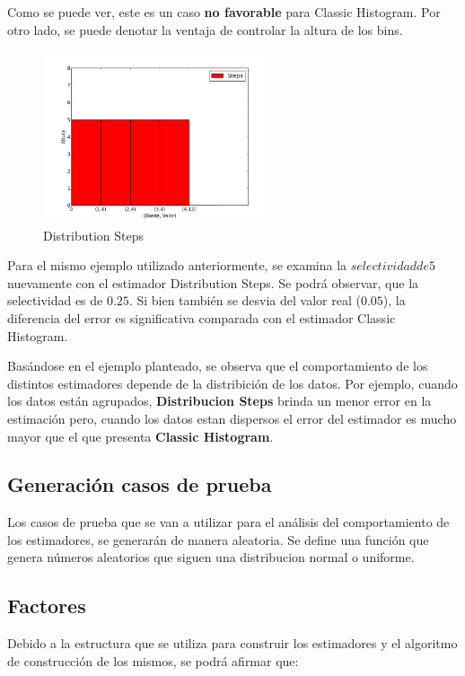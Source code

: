 \documentclass[10pt, a4paper,english,spanish,hidelinks]{article}
\begin{document}
Como se puede ver, este es un caso \textbf{no favorable} para Classic Histogram. Por otro lado, se puede denotar la ventaja de controlar la altura de los bins.

\newpage
\begin{figure}[h!]
  \centering
  \includegraphics[width=0.6\textwidth]{./imagenes/ejb1_ejemplo_steps.png}
  \caption{Distribution Steps}
\end{figure}


Para el mismo ejemplo utilizado anteriormente, se examina la $selectividad de 5$ nuevamente con el estimador Distribution Steps.
Se podrá observar, que la selectividad es de $0.25$. Si bien también se desvia del
valor real ($0.05$), la diferencia del error es significativa comparada con el estimador Classic Histogram.


Basándose en el ejemplo planteado, se observa que el comportamiento de los distintos estimadores
depende de la distribición de los datos.
Por ejemplo, cuando los datos están agrupados, \textbf{Distribucion Steps} brinda un menor
error en la estimación pero, cuando los datos estan dispersos el error del estimador es
mucho mayor que el que presenta \textbf{Classic Histogram}.


\subsection{Generación casos de prueba}
Los casos de prueba que se van a utilizar para el análisis del comportamiento de los
estimadores, se generarán de manera aleatoria. Se define una función que genera números
aleatorios que siguen una distribucion normal o uniforme.

\subsection{Factores}

Debido a la estructura que se utiliza para construir los estimadores y el algoritmo de
construcción de los mismos, se podrá afirmar que:
\end{document}
